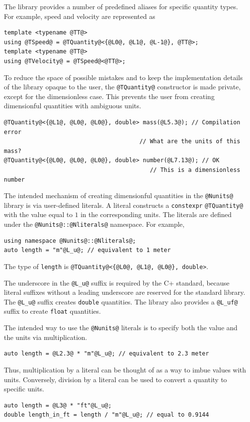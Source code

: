 \documentclass[11pt,letterpaper]{article}
\makeatletter
\newcommand{\lib}{\lstinline{@Nunits@} library}
\makeatother
\begin{document}
The library provides a number of predefined aliases for specific quantity types.
For example, speed and velocity are represented as
%
\begin{lstlisting}
template <typename @TT@>
using @TSpeed@ = @TQuantity@<{@L0@, @L1@, @L-1@}, @TT@>;
template <typename @TT@>
using @TVelocity@ = @TSpeed@<@TT@>;
\end{lstlisting}

To reduce the space of possible mistakes and to keep the implementation details of the library
opaque to the user, the \lstinline{@TQuantity@} constructor is made private,
except for the dimensionless case.
This prevents the user from creating dimensionful quantities with ambiguous units.
%
\begin{lstlisting}
@TQuantity@<{@L1@, @L0@, @L0@}, double> mass(@L5.3@); // Compilation error
                                       // What are the units of this mass?
@TQuantity@<{@L0@, @L0@, @L0@}, double> number(@L7.13@); // OK
                                          // This is a dimensionless number
\end{lstlisting}

The intended mechanism of creating dimensionful quantities in the \lib{} is via
user-defined literals.
A literal constructs a \lstinline{constexpr} \lstinline{@TQuantity@} with the value equal to
$1$ in the corresponding units.
The literals are defined under the \lstinline{@Nunits@::@Nliterals@} namespace.
For example,
%
\begin{lstlisting}
using namespace @Nunits@::@Nliterals@;
auto length = "m"@L_u@; // equivalent to 1 meter
\end{lstlisting}
%
The type of \lstinline{length} is \lstinline|@TQuantity@<{@L0@, @L1@, @L0@}, double>|.

The underscore in the \lstinline{@L_u@} suffix is required by the C\++ standard,
because literal suffixes without a leading underscore are reserved for the standard library.
The \lstinline{@L_u@} suffix creates \lstinline{double} quantities.
The library also provides a \lstinline{@L_uf@} suffix to create \lstinline{float} quantities.

The intended way to use the \lstinline{@Nunits@} literals is to specify both the value and
the units via multiplication.
%
\begin{lstlisting}
auto length = @L2.3@ * "m"@L_u@; // equivalent to 2.3 meter
\end{lstlisting}
%
Thus, multiplication by a literal can be thought of as a way to imbue values with units.
Conversely, division by a literal can be used to convert a quantity to specific units.
%
\begin{lstlisting}
auto length = @L3@ * "ft"@L_u@;
double length_in_ft = length / "m"@L_u@; // equal to 0.9144
\end{lstlisting}
\end{document}
